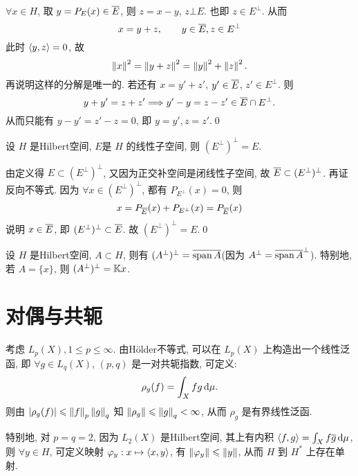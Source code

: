 	\begin{Proof}
		$ \forall x\in H $, 取 $ y=P_{E}(x)\in \baro{E} $, 则 $ z=x-y $, $ z\bot E $. 也即 $ z\in E^{\bot} $. 从而
		\[
			x=y+z, \qquad y\in \baro{E}, z\in E^{\bot}
		\]
		此时 $ \lrangle{y, z}=0 $, 故
		\[
			\norm{x}^{2}=\norm{y+z}^{2}=\norm{y}^{2}+\norm{z}^{2}.		
		\]
		再说明这样的分解是唯一的. 若还有 $ x=y'+z' $, $ y'\in\baro{E} $, $ z'\in E^{\bot} $. 则
		\[
			y+y'=z+z' \Longrightarrow y'-y=z-z'\in \baro{E}\cap E^{\bot}.
		\]
		从而只能有 $ y-y'=z'-z=0 $, 即 $ y=y', z=z' $.\qed
	\end{Proof}

	\begin{Corollary}
		设 $ H $ 是Hilbert空间, $ E $是 $ H $ 的线性子空间, 则 $ (E^{\bot})^{\bot}=E $.
	\end{Corollary}

	\begin{Proof}
		由定义得 $ E\subset (E^{\bot})^{\bot} $, 又因为正交补空间是闭线性子空间, 故 $ \baro{E}\subset (E^{\bot})^{\bot} $. 再证反向不等式. 因为 $ \forall x\in(E^{\bot})^{\bot}  $, 都有 $ P_{E^{\bot}}(x)=0 $, 则
		\[
			x=P_{\baro{E}}(x)+P_{E^{\bot}}(x)=P_{\baro{E}}(x)
		\]
		说明 $ x\in\baro{E} $, 即 $ (E^{\bot})^{\bot}\subset \baro{E} $. 故 $ (E^{\bot})^{\bot}=E $.\qed
	\end{Proof}

	\begin{Remark}
		设 $ H $ 是Hilbert空间, $ A\subset H $, 则有 $ (A^{\bot})^{\bot}=\baro{\Span A} $(因为 $ A^{\bot}=\baro{\Span A}^{\bot} $). 特别地, 若 $ A=\{ x \} $, 则 $ (A^{\bot})^{\bot}=\K x $.
	\end{Remark}

\section{对偶与共轭}

	考虑 $ L_{p}(X), 1\leqslant p\leqslant\infty $. 由H\"older不等式, 可以在 $ L_{p}(X) $ 上构造出一个线性泛函, 即 $ \forall g\in L_{q}(X) $, $ (p, q) $ 是一对共轭指数, 可定义:
	\[
		\rho_{g}(f)=\int_{X}fg\diff\mu.
	\]
	则由 $ \abs{\rho_{g}(f)}\leqslant\norm{f}_{p}\norm{g}_{q} $ 知 $ \norm{\rho_{g}}\leqslant\norm{g}_{q}<\infty $, 从而 $ \rho_{g} $ 是有界线性泛函. 

	特别地, 对 $ p=q=2 $, 因为 $ L_{2}(X) $ 是Hilbert空间, 其上有内积 $ \lrangle{f, g}=\int_{X}f\baro{g}\diff\mu $, 则 $ \forall y\in H $, 可定义映射 $ \varphi_{y}:x\mapsto \lrangle{x, y} $, 有 $ \norm{\varphi_{y}}\leqslant\norm{y} $, 从而 $ H $ 到 $ H^{*} $ 上存在单射.

